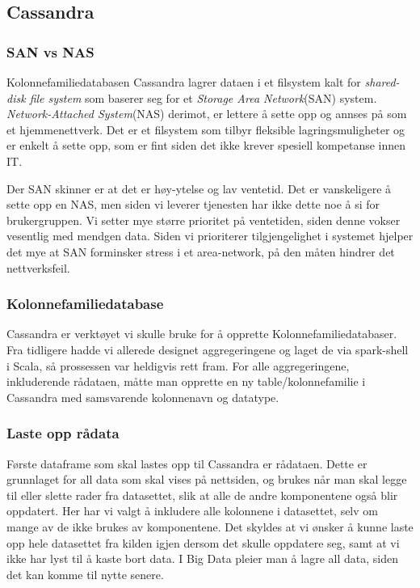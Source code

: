 \subsection{Cassandra}

\subsubsection{SAN vs NAS}
Kolonnefamiliedatabasen Cassandra lagrer dataen i et filsystem kalt for \textit{shared-disk file system} som baserer seg for et \textit{Storage Area Network}(SAN) system. \textit{Network-Attached System}(NAS) derimot, er lettere å sette opp og annses på som et hjemmenettverk. Det er et filsystem som tilbyr fleksible lagringsmuligheter og er enkelt å sette opp, som er fint siden det ikke krever spesiell kompetanse innen IT.

Der SAN skinner er at det er høy-ytelse og lav ventetid. Det er vanskeligere å sette opp en NAS, men siden vi leverer tjenesten har ikke dette noe å si for brukergruppen. Vi setter mye større prioritet på ventetiden, siden denne vokser vesentlig med mendgen data. Siden vi prioriterer tilgjengelighet i systemet hjelper det mye at SAN forminsker stress i et area-network, på den måten hindrer det nettverksfeil.

\subsubsection{Kolonnefamiliedatabase}
Cassandra er verktøyet vi skulle bruke for å opprette Kolonnefamiliedatabaser. Fra tidligere hadde vi allerede designet aggregeringene og laget de via spark-shell i Scala, så prossessen var heldigvis rett fram. For alle aggregeringene, inkluderende rådataen, måtte man opprette en ny table/kolonnefamilie i Cassandra med samsvarende kolonnenavn og datatype.

\subsubsection{Laste opp rådata}
Første dataframe som skal lastes opp til Cassandra er rådataen. Dette er grunnlaget for all data som skal vises på nettsiden, og brukes når man skal legge til eller slette rader fra datasettet, slik at alle de andre komponentene også blir oppdatert. Her har vi valgt å inkludere alle kolonnene i datasettet, selv om mange av de ikke brukes av komponentene. Det skyldes at vi ønsker å kunne laste opp hele datasettet fra kilden igjen dersom det skulle oppdatere seg, samt at vi ikke har lyst til å kaste bort data. I Big Data pleier man å lagre all data, siden det kan komme til nytte senere.

